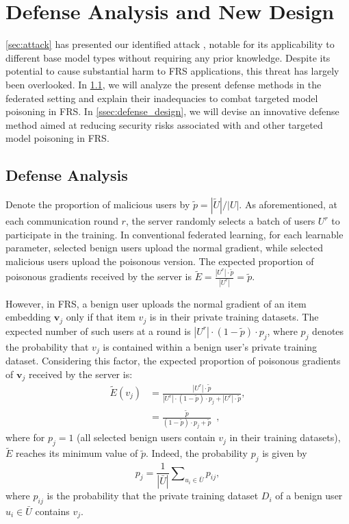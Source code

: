 \section{Defense Analysis and New Design}
\label{sec:defense}

\cref{sec:attack} has presented our identified attack \model{}, notable for its applicability to different base model types without requiring any prior knowledge.
Despite its potential to cause substantial harm to FRS applications, this threat has largely been overlooked.
In \cref{ssec:defense_analysis}, we will analyze the present defense methods in the federated setting and explain their inadequacies to combat targeted model poisoning in FRS.
In \cref{ssec:defense_design}, we will devise an innovative defense method aimed at reducing security risks associated with \model{} and other targeted model poisoning in FRS.

\subsection{Defense Analysis}
\label{ssec:defense_analysis}

Denote the proportion of malicious users by $\tilde{p} = |\tilde{{U}}| / |{U}|$.
As aforementioned, at each communication round $r$, the server randomly selects a batch of users ${U}^r$ to participate in the training.
In conventional federated learning, for each learnable parameter, selected benign users upload the normal gradient, while selected malicious users upload the poisonous version.
The expected proportion of poisonous gradients received by the server is $\tilde{E} = \frac{|{U}^r|\cdot\tilde{p}}{|{U}^r|}=\tilde{p}$.

However, in FRS, a benign user uploads the normal gradient of an item embedding $\mathbf{v}_j$ only if that item $v_j$ is in their private training datasets.
The expected number of such users at a round is $|{U}^r|\cdot (1-\tilde{p})\cdot p_j$, where $p_j$ denotes the probability that $v_j$ is contained within a benign user's private training dataset.
Considering this factor, the expected proportion of poisonous gradients of $\mathbf{v}_j$ received by the server is:
\begin{equation}
\label{eq:exp}
\begin{aligned}
\tilde{E}(v_j)
&=\frac{|{U}^r|\cdot\tilde{p}}{|{U}^r|\cdot (1-\tilde{p})\cdot p_j + |{U}^r|\cdot\tilde{p}},\\
&=\frac{\tilde{p}}{(1-\tilde{p})\cdot p_j+\tilde{p}} \,\,\, ,
\end{aligned}
\end{equation}
where for $p_j=1$ (all selected benign users contain $v_j$ in their training datasets), $\tilde{E}$ reaches its minimum value of $\tilde{p}$.
Indeed, the probability $p_j$ is given by
\begin{equation}\label{equ:p_j}
p_j=\frac{1}{|\bar{{U}}|} \sum\nolimits_{u_i\in\bar{{U}}}p_{{ij}},
\end{equation}
where $p_{{ij}}$ is the probability that the private training dataset ${D}_i$ of a benign user $u_i \in \bar{{U}}$ contains $v_j$.

